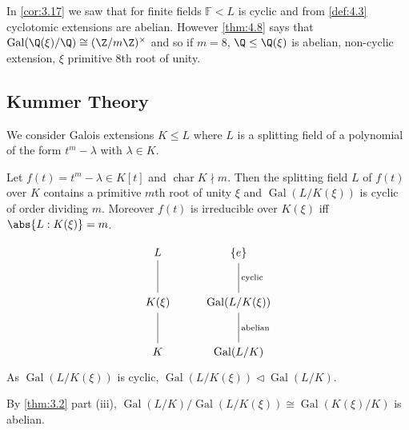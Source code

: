 \documentclass{article}
\DeclareMathOperator{\chara}{char}
\DeclareMathOperator{\Gal}{Gal}
\newcommand{\F}{\mathbb{F}}
\begin{document}
\begin{eg}
    In \cref{cor:3.17} we saw that for finite fields $\F < L$ is cyclic and from \cref{def:4.3} cyclotomic extensions are abelian.
    However \cref{thm:4.8} says that $\Gal(\Q(\xi)/\Q) \cong (\Z/m\Z)^\times$ and so if $m=8$, $\Q \leq \Q(\xi)$ is abelian, non-cyclic extension, $\xi$ primitive $8$th root of unity.
\end{eg}

\subsection{Kummer Theory}
We consider Galois extensions $K \leq L$ where $L$ is a splitting field of a polynomial of the form $t^m - \lambda$ with $\lambda \in K$.

\begin{nthm}\label{thm:4.10}
    Let $f(t) = t^m - \lambda \in K[t]$ and $\chara K \nmid m$.
    Then the splitting field $L$ of $f(t)$ over $K$ contains a primitive $m$th root of unity $\xi$ and $\Gal(L/K(\xi))$ is cyclic of order dividing $m$.
    Moreover $f(t)$ is irreducible over $K(\xi)$ iff $\abs{L:K(\xi)} = m$.
\end{nthm}

\begin{remark}
    \begin{equation*}
        \begin{tikzcd}[row sep=large]
            L \arrow[d, no head] & \{e\} \arrow[d, no head, "\text{cyclic}"] \\
            K(\xi) \arrow[d, no head] & \Gal(L/K(\xi)) \arrow[d, no head, "\text{abelian}"] \\
            K & \Gal(L/K)
        \end{tikzcd}
    \end{equation*}
    As $\Gal(L/K(\xi))$ is cyclic, $\Gal(L/K(\xi)) \lhd \Gal(L/K)$.

    By \cref{thm:3.2} part (iii), $\Gal(L/K)/\Gal(L/K(\xi)) \cong \Gal(K(\xi)/K)$ is abelian.
\end{remark}
\end{document}
